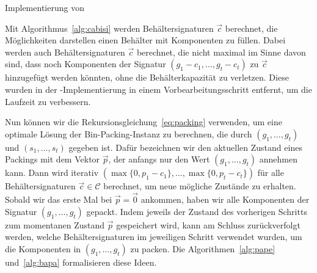 \begin{algorithm}
    \caption{Implementierung von }
    \label{alg:cabisi}
    \begin{algorithmic}
                 
                       \EndIf
                    \EndFor
                \EndFor
            \EndFor
        \EndFunction
    \end{algorithmic}
\end{algorithm}

\begin{rem}
    Mit Algorithmus~\ref{alg:cabisi} werden Behältersignaturen $\vec{c}$ berechnet, die Möglichkeiten darstellen einen Behälter mit Komponenten zu füllen.
    Dabei werden auch Behältersignaturen $\vec{c}$ berechnet, die nicht maximal im Sinne davon sind, dass noch Komponenten der Signatur $(g_1 - c_1, \ldots, g_t - c_t)$ zu $\vec{c}$ hinzugefügt werden könnten, ohne die Behälterkapazität zu verletzen.
    Diese wurden in der \Cpp\hyp Implementierung in einem Vorbearbeitungsschritt entfernt, um die Laufzeit zu verbessern.
\end{rem}

Nun können wir die Rekursionsgleichung~\eqref{eq:packing} verwenden, um eine optimale Lösung der Bin-Packing-Instanz zu berechnen, die durch $(g_1, \ldots, g_t)$ und $(s_1, \ldots, s_t)$ gegeben ist.
Dafür bezeichnen wir den aktuellen Zustand eines Packings mit dem Vektor $\vec{p}$, der anfangs nur den Wert $(g_1, \ldots, g_t)$ annehmen kann.
Dann wird iterativ $(\max\{0, p_1 - c_1\}, \ldots, \max\{0, p_t - c_t\})$ für alle Behältersignaturen $\vec{c} \in \mathcal{C}$ berechnet, um neue mögliche Zustände zu erhalten.
Sobald wir das erste Mal bei $\vec{p} = \vec{0}$ ankommen, haben wir alle Komponenten der Signatur $(g_1, \ldots, g_t)$ gepackt.
Indem jeweils der Zustand des vorherigen Schritts zum momentanen Zustand $\vec{p}$ gespeichert wird, kann am Schluss zurückverfolgt werden, welche Behältersignaturen im jeweiligen Schritt verwendet wurden, um die Komponenten in $(g_1, \ldots, g_t)$ zu packen.
Die Algorithmen~\ref{alg:pape} und~\ref{alg:bapa} formalisieren diese Ideen.


